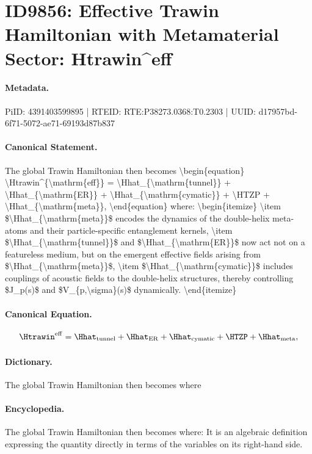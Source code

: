 \section*{ID9856: Effective Trawin Hamiltonian with Metamaterial Sector: Htrawin\textasciicircum{}eff}
\paragraph{Metadata.}
PiID: 4391403599895 | RTEID: RTE:P38273.0368:T0.2303 | UUID: d17957bd-6f71-5072-ae71-69193d87b837

\paragraph{Canonical Statement.}
The global Trawin Hamiltonian then becomes \textbackslash{}begin\{equation\} \textbackslash{}Htrawin\textasciicircum{}\{\textbackslash{}mathrm\{eff\}\} = \textbackslash{}Hhat\_\{\textbackslash{}mathrm\{tunnel\}\} + \textbackslash{}Hhat\_\{\textbackslash{}mathrm\{ER\}\} + \textbackslash{}Hhat\_\{\textbackslash{}mathrm\{cymatic\}\} + \textbackslash{}HTZP + \textbackslash{}Hhat\_\{\textbackslash{}mathrm\{meta\}\}, \textbackslash{}end\{equation\} where: \textbackslash{}begin\{itemize\} \textbackslash{}item \$\textbackslash{}Hhat\_\{\textbackslash{}mathrm\{meta\}\}\$ encodes the dynamics of the double-helix meta-atoms and their particle-specific entanglement kernels, \textbackslash{}item \$\textbackslash{}Hhat\_\{\textbackslash{}mathrm\{tunnel\}\}\$ and \$\textbackslash{}Hhat\_\{\textbackslash{}mathrm\{ER\}\}\$ now act not on a featureless medium, but on the emergent effective fields arising from \$\textbackslash{}Hhat\_\{\textbackslash{}mathrm\{meta\}\}\$, \textbackslash{}item \$\textbackslash{}Hhat\_\{\textbackslash{}mathrm\{cymatic\}\}\$ includes couplings of acoustic fields to the double-helix structures, thereby controlling \$J\_p(s)\$ and \$V\_\{p,\textbackslash{}sigma\}(s)\$ dynamically. \textbackslash{}end\{itemize\}

\paragraph{Canonical Equation.}
\[
\Htrawin^{\mathrm{eff}} = \Hhat_{\mathrm{tunnel}} + \Hhat_{\mathrm{ER}} + \Hhat_{\mathrm{cymatic}} + \HTZP + \Hhat_{\mathrm{meta}},
\]

\paragraph{Dictionary.}
The global Trawin Hamiltonian then becomes where

\paragraph{Encyclopedia.}
The global Trawin Hamiltonian then becomes where: It is an algebraic definition expressing the quantity directly in terms of the variables on its right-hand side.
